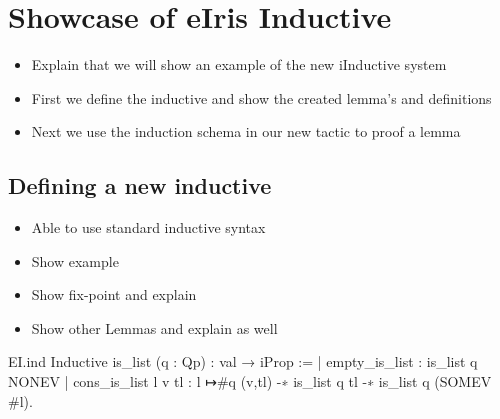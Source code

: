 \documentclass[thesis.tex]{subfiles}
\begin{document}
\chapter{Showcase of eIris Inductive}
\begin{itemize}
    \item Explain that we will show an example of the new iInductive system
    \item First we define the inductive and show the created lemma's and definitions
    \item Next we use the induction schema in our new tactic to proof a lemma
\end{itemize}
\section{Defining a new inductive}
\begin{itemize}
    \item Able to use standard \coq inductive syntax
    \item Show example
    \item Show fix-point and explain
    \item Show other Lemmas and explain as well
\end{itemize}
\begin{coqcode}
    EI.ind 
    Inductive is_list (q : Qp) : val → iProp :=
      | empty_is_list : is_list q NONEV
      | cons_is_list l v tl : 
        l ↦{#q} (v,tl) -∗ is_list q tl 
        -∗ is_list q (SOMEV #l).  
\end{coqcode}
\end{document}
